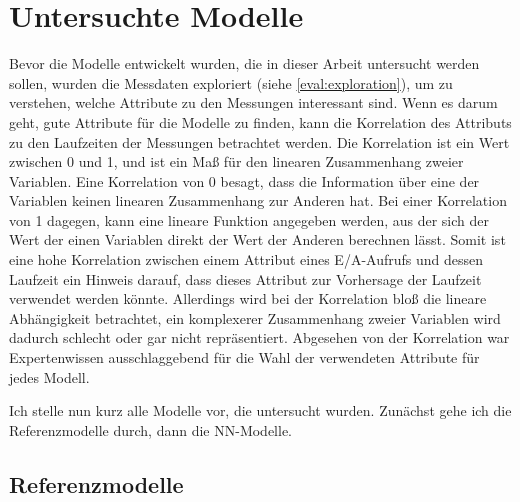\documentclass[
	12pt,
	a4paper,
	BCOR10mm,
	DIV14,
	listof=totoc,
	bibliography=totoc,
	headsepline
]{scrreprt}
\begin{document}
\section{Untersuchte Modelle}
\label{analyse:modelle}
Bevor die Modelle entwickelt wurden, die in dieser Arbeit untersucht werden sollen, wurden die Messdaten exploriert (siehe \ref{eval:exploration}), um zu verstehen, welche Attribute zu den Messungen interessant sind.
Wenn es darum geht, gute Attribute für die Modelle zu finden, kann die Korrelation des Attributs zu den Laufzeiten der Messungen betrachtet werden.
Die Korrelation ist ein Wert zwischen 0 und 1, und ist ein Maß für den linearen Zusammenhang zweier Variablen. Eine Korrelation von 0 besagt, dass die Information über eine der Variablen keinen linearen Zusammenhang zur Anderen hat.
Bei einer Korrelation von 1 dagegen, kann eine lineare Funktion angegeben werden, aus der sich der Wert der einen Variablen direkt der Wert der Anderen berechnen lässt. Somit ist eine hohe Korrelation zwischen einem Attribut eines E/A-Aufrufs und dessen Laufzeit ein Hinweis darauf, dass dieses Attribut zur Vorhersage der Laufzeit verwendet werden könnte. 
Allerdings wird bei der Korrelation bloß die lineare Abhängigkeit betrachtet, ein komplexerer Zusammenhang zweier Variablen wird dadurch schlecht oder gar nicht repräsentiert.
Abgesehen von der Korrelation war Expertenwissen ausschlaggebend für die Wahl der verwendeten Attribute für jedes Modell.

Ich stelle nun kurz alle Modelle vor, die untersucht wurden. Zunächst gehe ich die Referenzmodelle durch, dann die NN-Modelle.

\subsection{Referenzmodelle}
\end{document}
